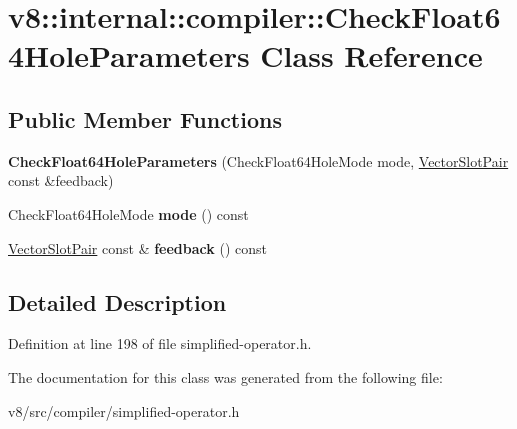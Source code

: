\hypertarget{classv8_1_1internal_1_1compiler_1_1CheckFloat64HoleParameters}{}\section{v8\+:\+:internal\+:\+:compiler\+:\+:Check\+Float64\+Hole\+Parameters Class Reference}
\label{classv8_1_1internal_1_1compiler_1_1CheckFloat64HoleParameters}
\subsection*{Public Member Functions}
\begin{DoxyCompactItemize}
\item 
\mbox{\label{classv8_1_1internal_1_1compiler_1_1CheckFloat64HoleParameters_a0e81158e47dce0fc4faba1eb868a3478}} 
{\bfseries Check\+Float64\+Hole\+Parameters} (Check\+Float64\+Hole\+Mode mode, \mbox{\hyperlink{classv8_1_1internal_1_1VectorSlotPair}{Vector\+Slot\+Pair}} const \&feedback)
\item 
\mbox{\label{classv8_1_1internal_1_1compiler_1_1CheckFloat64HoleParameters_a385837ef47793de2a65c065e7bb40406}} 
Check\+Float64\+Hole\+Mode {\bfseries mode} () const
\item 
\mbox{\label{classv8_1_1internal_1_1compiler_1_1CheckFloat64HoleParameters_acff7a5cc9c2f186cddec1bbaadd22ab5}} 
\mbox{\hyperlink{classv8_1_1internal_1_1VectorSlotPair}{Vector\+Slot\+Pair}} const  \& {\bfseries feedback} () const
\end{DoxyCompactItemize}


\subsection{Detailed Description}


Definition at line 198 of file simplified-\/operator.\+h.



The documentation for this class was generated from the following file\+:\begin{DoxyCompactItemize}
\item 
v8/src/compiler/simplified-\/operator.\+h\end{DoxyCompactItemize}

